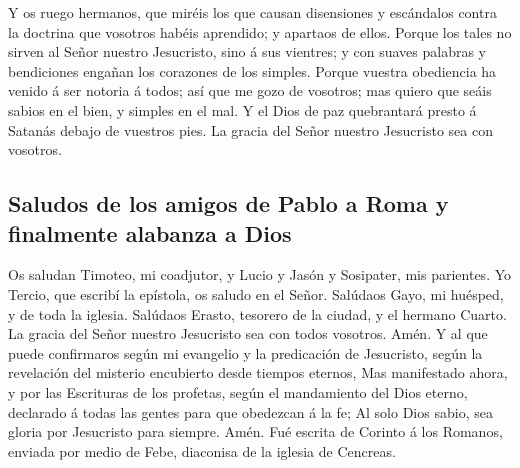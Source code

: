  Y os ruego hermanos, que miréis los que causan disensiones
y escándalos contra la doctrina que vosotros habéis aprendido; y
apartaos de ellos.  Porque los tales no sirven al Señor
nuestro Jesucristo, sino á sus vientres; y con suaves palabras y
bendiciones engañan los corazones de los simples.  Porque
vuestra obediencia ha venido á ser notoria á todos; así que me gozo de
vosotros; mas quiero que seáis sabios en el bien, y simples en el mal.
 Y el Dios de paz quebrantará presto á Satanás debajo de
vuestros pies. La gracia del Señor nuestro Jesucristo sea con vosotros.

\hypertarget{saludos-de-los-amigos-de-pablo-a-roma-y-finalmente-alabanza-a-dios}{%
\subsection{Saludos de los amigos de Pablo a Roma y finalmente alabanza
a
Dios}\label{saludos-de-los-amigos-de-pablo-a-roma-y-finalmente-alabanza-a-dios}}

 Os saludan Timoteo, mi coadjutor, y Lucio y Jasón y
Sosipater, mis parientes.  Yo Tercio, que escribí la
epístola, os saludo en el Señor.  Salúdaos Gayo, mi
huésped, y de toda la iglesia. Salúdaos Erasto, tesorero de la ciudad, y
el hermano Cuarto.  La gracia del Señor nuestro Jesucristo
sea con todos vosotros. Amén.  Y al que puede confirmaros
según mi evangelio y la predicación de Jesucristo, según la revelación
del misterio encubierto desde tiempos eternos,  Mas
manifestado ahora, y por las Escrituras de los profetas, según el
mandamiento del Dios eterno, declarado á todas las gentes para que
obedezcan á la fe;  Al solo Dios sabio, sea gloria por
Jesucristo para siempre. Amén. Fué escrita de Corinto á los Romanos,
enviada por medio de Febe, diaconisa de la iglesia de Cencreas.

